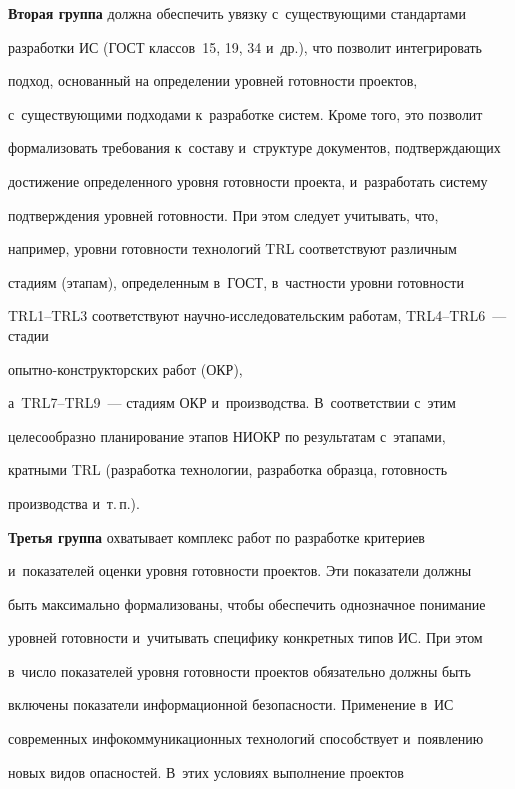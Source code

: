  

  \textbf{Вторая группа} должна обеспечить увязку с~существующими стандартами 

разработки ИС (ГОСТ классов~15, 19, 34 и~др.), что позволит интегрировать 

подход, основанный на определении уровней готовности проектов, 

с~сущест\-ву\-ющи\-ми подходами к~разработке систем. Кроме того, это позволит 

формализовать требования к~составу и~структуре документов, подтверждающих 

достижение определенного уровня готовности проекта, и~разработать систему 

подтверждения уровней готовности. При этом следует учитывать, что, 

например, уровни готовности технологий TRL соответствуют различным 

стадиям (этапам), определенным в~ГОСТ, в~частности уровни готовности 

 TRL1--TRL3 соответствуют на\-уч\-но-ис\-сле\-до\-ва\-тель\-ским работам, TRL4--TRL6~--- стадии 

 опыт\-но-кон\-ст\-рук\-тор\-ских работ (ОКР),  

а~TRL7--TRL9~--- стадиям ОКР и~производства. В~соответствии с~этим 

целесообразно планирование этапов НИОКР по результатам с~этапами, 

кратными TRL (разработка технологии, разработка образца, готовность 

производства и~т.\,п.). 

  

 \textbf{Третья группа} охватывает комплекс работ по разработке критериев 

и~показателей оценки уровня готовности проектов. Эти показатели должны 

быть максимально формализованы, чтобы обеспечить однозначное понимание 

уровней готовности и~учитывать специфику конкретных типов ИС. При этом 

в~число показателей уровня готовности проектов обязательно должны быть 

включены показатели информационной безопасности. Применение в~ИС 

современных инфокоммуникационных технологий способствует и~появлению 

новых видов опасностей. В~этих условиях выполнение проектов 

